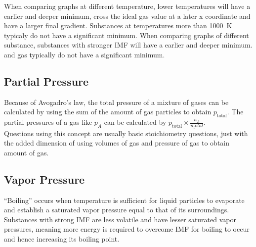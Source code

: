 \documentclass[../main]{subfiles}
\begin{document}
	When comparing graphs at different temperature, lower temperatures will have a earlier and deeper minimum, cross the ideal gas value at a later x coordinate and have a larger final gradient. Substances at temperatures more than \SI{1000}{\K} typicaly do not have a significant minimum. When comparing graphs of different substance, substances with stronger IMF will have a earlier and deeper minimum.  and  gas typically do not have a significant minimum. \\

	\subsection{Partial Pressure}



	Because of Avogadro's law, the total pressure of a mixture of gases can be calculated by using the sum of the amount of gas particles to obtain \(p_\text{total}\). The partial pressures of a gas like \(p_A\) can be calculated by \(p_\text{total} \times \frac{n_A}{n_total}\). \\

	Questions using this concept are usually basic stoichiometry questions, just with the added dimension of using volumes of gas and pressure of gas to obtain amount of gas.

	\subsection{Vapor Pressure}




	``Boiling'' occurs when temperature is sufficient for liquid particles to evaporate and establish a saturated vapor pressure equal to that of its surroundings. Substances with strong IMF are less volatile and have lesser saturated vapor pressures, meaning more energy is required to overcome IMF for boiling to occur and hence increasing its boiling point.
\end{document}
